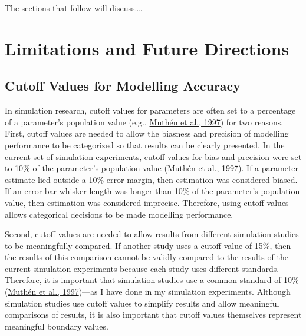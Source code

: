 \documentclass[
12pt, %
twoside,
english]{guelphthesis}
\begin{document}
The sections that follow will discuss\ldots.

\hypertarget{limitations-and-future-directions}{%
\section{Limitations and Future Directions}\label{limitations-and-future-directions}}

\hypertarget{cutoff-values-for-modelling-accuracy}{%
\subsection{Cutoff Values for Modelling Accuracy}\label{cutoff-values-for-modelling-accuracy}}

In simulation research, cutoff values for parameters are often set to a percentage of a parameter's population value (e.g., \protect\hyperlink{ref-muthen1997}{Muthén et al., 1997}) for two reasons. First, cutoff values are needed to allow the biasness and precision of modelling performance to be categorized so that results can be clearly presented. In the current set of simulation experiments, cutoff values for bias and precision were set to 10\% of the parameter's population value (\protect\hyperlink{ref-muthen1997}{Muthén et al., 1997}). If a parameter estimate lied outside a 10\%-error margin, then estimation was considered biased. If an error bar whisker length was longer than 10\% of the parameter's population value, then estimation was considered imprecise. Therefore, using cutoff values allows categorical decisions to be made modelling performance.

Second, cutoff values are needed to allow results from different simulation studies to be meaningfully compared. If another study uses a cutoff value of 15\%, then the results of this comparison cannot be validly compared to the results of the current simulation experiments because each study uses different standards. Therefore, it is important that simulation studies use a common standard of 10\% (\protect\hyperlink{ref-muthen1997}{Muthén et al., 1997})---as I have done in my simulation experiments. Although simulation studies use cutoff values to simplify results and allow meaningful comparisons of results, it is also important that cutoff values themselves represent meaningful boundary values.
\end{document}
